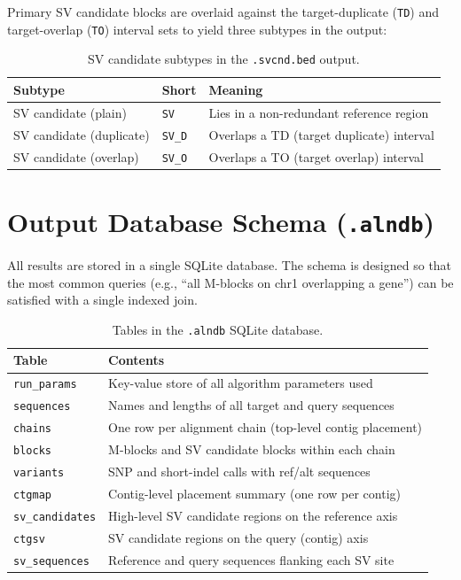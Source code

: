 \documentclass[11pt,a4paper]{article}
\begin{document}
Primary SV candidate blocks are overlaid against the target-duplicate (\texttt{TD})
and target-overlap (\texttt{TO}) interval sets to yield three subtypes in the output:

\begin{table}[h]
\centering
\caption{SV candidate subtypes in the \texttt{.svcnd.bed} output.}
\begin{tabular}{lll}
\toprule
\textbf{Subtype} & \textbf{Short} & \textbf{Meaning} \\
\midrule
SV candidate (plain)     & \texttt{SV}  & Lies in a non-redundant reference region \\
SV candidate (duplicate) & \texttt{SV\_D} & Overlaps a TD (target duplicate) interval \\
SV candidate (overlap)   & \texttt{SV\_O} & Overlaps a TO (target overlap) interval \\
\bottomrule
\end{tabular}
\end{table}

\section{Output Database Schema (\texttt{.alndb})}
\label{sec:schema}

All results are stored in a single SQLite database.
The schema is designed so that the most common queries
(e.g., ``all M-blocks on chr1 overlapping a gene'') can be satisfied
with a single indexed join.

\begin{table}[h]
\centering
\caption{Tables in the \texttt{.alndb} SQLite database.}
\begin{tabular}{lp{9cm}}
\toprule
\textbf{Table} & \textbf{Contents} \\
\midrule
\texttt{run\_params}   & Key-value store of all algorithm parameters used \\
\texttt{sequences}     & Names and lengths of all target and query sequences \\
\texttt{chains}        & One row per alignment chain (top-level contig placement) \\
\texttt{blocks}        & M-blocks and SV candidate blocks within each chain \\
\texttt{variants}      & SNP and short-indel calls with ref/alt sequences \\
\texttt{ctgmap}        & Contig-level placement summary (one row per contig) \\
\texttt{sv\_candidates}& High-level SV candidate regions on the reference axis \\
\texttt{ctgsv}         & SV candidate regions on the query (contig) axis \\
\texttt{sv\_sequences} & Reference and query sequences flanking each SV site \\
\bottomrule
\end{tabular}
\end{table}
\end{document}
